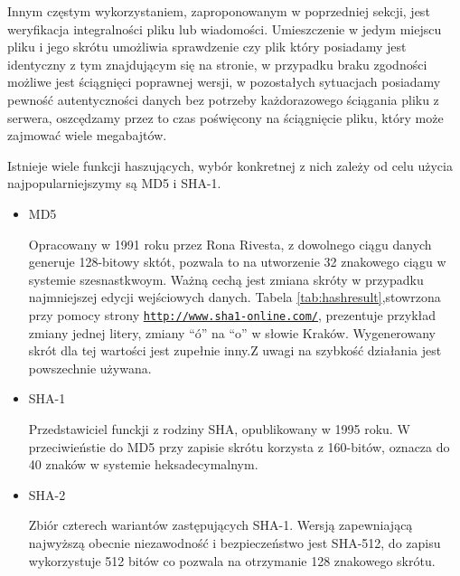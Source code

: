 Innym częstym wykorzystaniem, zaproponowanym w poprzedniej sekcji, jest weryfikacja integralności pliku lub wiadomości. Umieszczenie w jedym miejscu pliku i jego skrótu umożliwia sprawdzenie czy plik który posiadamy jest identyczny z tym znajdującym się na stronie, w przypadku braku zgodności możliwe jest ściągnięci poprawnej wersji, w pozostałych sytuacjach posiadamy pewność autentyczności danych bez potrzeby każdorazowego ściągania pliku z serwera, oszcędzamy przez to czas poświęcony na ściągnięcie pliku, który może zajmować wiele megabajtów.

Istnieje wiele funkcji haszujących, wybór konkretnej z nich zależy od celu użycia najpopularniejszymy są MD5 i SHA-1.

\begin{itemize}
\item
MD5

Opracowany w 1991 roku przez Rona Rivesta, z dowolnego ciągu danych generuje 128-bitowy sktót, pozwala to na utworzenie 32 znakowego ciągu w systemie szesnastkwoym. Ważną cechą jest zmiana skróty w przypadku najmniejszej edycji wejściowych danych. Tabela \ref{tab:hashresult},stowrzona przy pomocy strony \underline{\texttt{http://www.sha1-online.com/}}, prezentuje przykład zmiany jednej litery, zmiany ``ó'' na ``o'' w słowie Kraków. Wygenerowany skrót dla tej wartości jest zupełnie inny.Z uwagi na szybkość działania jest powszechnie używana.

\item
SHA-1

Przedstawiciel funckji z rodziny SHA, opublikowany w 1995 roku. W przeciwieństie do MD5 przy zapisie skrótu korzysta z 160-bitów, oznacza do 40 znaków w systemie heksadecymalnym.

\item
SHA-2

Zbiór czterech wariantów zastępujących SHA-1. Wersją zapewniającą najwyższą obecnie niezawodność i bezpieczeństwo jest SHA-512, do zapisu wykorzystuje 512 bitów co pozwala na otrzymanie 128 znakowego skrótu.

\end{itemize}

